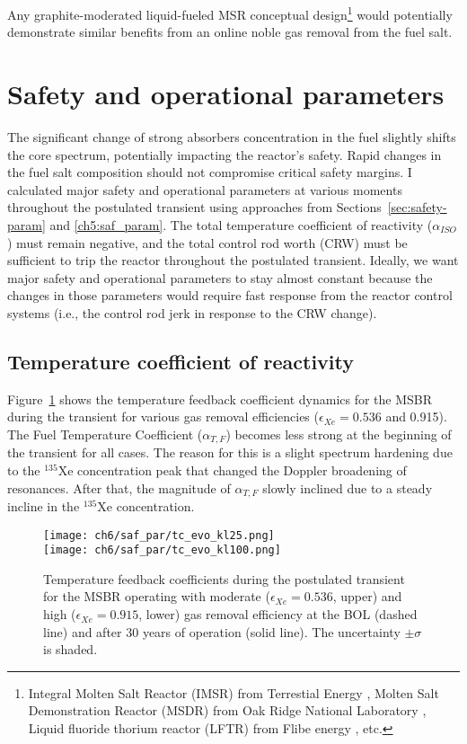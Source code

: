 Any graphite-moderated liquid-fueled \gls{MSR} conceptual 
design\footnote{Integral Molten Salt Reactor (IMSR) from Terrestial Energy 
\cite{leblanc_integral_nodate}, Molten Salt Demonstration Reactor (MSDR) from 
Oak Ridge National Laboratory \cite{bettis_design_1972}, Liquid fluoride 
thorium reactor (LFTR) from Flibe energy \cite{sorensen_liquid-fluoride_2016}, 
etc.} would potentially demonstrate similar benefits from an online noble gas 
removal from the fuel salt.


\section{Safety and operational parameters}
The significant change of strong absorbers concentration in the fuel slightly 
shifts the core spectrum, potentially impacting the reactor's safety.
Rapid changes in the fuel salt composition should not compromise critical 
safety margins.
I calculated major safety and operational parameters at various moments 
throughout the postulated transient using approaches from 
Sections~\ref{sec:safety-param} and \ref{ch5:saf_param}. 
The total temperature coefficient of reactivity ($\alpha_{ISO}$) must remain 
negative, and the total control rod worth (CRW) must be sufficient to trip the 
reactor throughout the postulated transient. Ideally, we want major safety 
and operational parameters to stay almost constant because the changes in 
those parameters would require fast response from the reactor control systems 
(i.e., the control rod jerk in response to the CRW change).

\subsection{Temperature coefficient of reactivity}
Figure~\ref{fig:msbr-lf-tc-evo} shows the temperature feedback coefficient 
dynamics for the \gls{MSBR} during the transient for various gas removal 
efficiencies ($\epsilon_{Xe}=0.536$ and 0.915). 
The Fuel Temperature Coefficient ($\alpha_{T,F}$) becomes less strong at the 
beginning of the transient for all cases. The reason for this is a 
slight spectrum hardening due to the $^{135}$Xe concentration peak that 
changed the Doppler broadening of resonances. After that, the magnitude of 
$\alpha_{T,F}$ slowly inclined due to a steady incline in the $^{135}$Xe 
concentration.
\begin{figure}[htbp!] %
	\centering
	\texttt{[image: ch6/saf\_par/tc\_evo\_kl25.png]}\\
	\vspace{-12mm}
	\hspace{+0.05mm}
	\texttt{[image: ch6/saf\_par/tc\_evo\_kl100.png]}
	\vspace{-3mm}
	\caption{Temperature feedback coefficients during the postulated transient 
	for the \gls{MSBR} operating with moderate ($\epsilon_{Xe}=0.536$, upper) 
	and high ($\epsilon_{Xe}=0.915$, lower) gas removal efficiency at the 
	\gls{BOL} (dashed line) and after 30 years of operation (solid line).
	The	uncertainty $\pm\sigma$ is shaded.}
	\label{fig:msbr-lf-tc-evo}
\end{figure}

